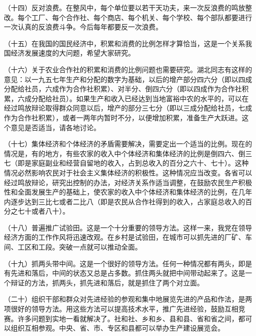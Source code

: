 （十四）反对浪费。在整风中，每个单位要以若干天功夫，来一次反浪费的鸣放整改。每个工厂、每个合作社、每个商店、每个机关、每个学校、每个部队都要进行一次认真的反浪费斗争。今后每年都要反一次浪费。

（十五）在我国的国民经济中，积累和消费的比例怎样才算恰当，这是一个关系我国经济发展速度的大问题，希望大家研究。

（十六）关于农业合作社的积累和消费的比例问题也需要研究。湖北同志有这样的意见：以一九五七年生产和分配的数字为基础，以后的增产部分四六分（即以四成分配给社员，六成作为合作社积累）、对半分、倒四六分（即以四成作为合作社积累，六成分配给社员）。如果生产和收入已经达到当地富裕中农的水平的，可以在经过鸣放辩论取得群众同意以后，增产的部分三七分（即以三成分配给社员，七成作为合作社积累），或者一两年内暂时不分，以便增加积累，准备生产大跃进。这个意见是否适当，请各地讨论。

（十七）集体经济和个体经济的矛盾需要解决，需要定出一个适当的比例。现在的情况是，有的地方，有些农家的收入中个体经济和集体经济的比例是倒四六、倒三七（即是家庭副业和经营自留地的收入，占到总收入的百分之六十、七十）。这种情况必然影响农民对于社会主义集体经济的积极性。这种情况应当改变。各省可以经过鸣放辩论，研究出控制的办法，对经济关系作适当调整，在鼓励农民生产积极性和全面发展生产的基础上，使农家的收入中个体经济和集体经济的比例，在几年内逐步达到三比七或者二比八（即是农民从合作社得到的收入，占家庭总收入的百分之七十或者八十）。

（十八）普遍推广试验田。这是一个十分重要的领导方法。这样一来，我党在领导经济方面的工作作风将迅速改观。在乡村是试验田，在城市可以抓先进的厂矿、车间、工区和工段。突破一点就可以推动全面。

（十九）抓两头带中间。这是一个很好的领导方法。任何一种情况都有两头，即是有先进和落后，中间的状态又总是占多数。抓住两头就把中间带动起来了。这是一个辩证的方法，抓两头，抓先进和落后，就是抓住了两个对立面。

（二十）组织干部和群众对先进经验的参观和集中地展览先进的产品和作法，是两项很好的领导方法。用这些方法可以提高技术水平，推广先进经验，鼓励互相竞赛。许多问题到实地一看就解决了。社和社、乡和乡、县和县、省和省之间，都可以组织互相参观。中央、省、市、专区和县都可以举办生产建设展览会。


